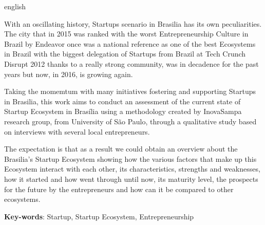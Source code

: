 \begin{resumo}[Abstract]
 \begin{otherlanguage*}{english}

With an oscillating history, Startups scenario in Brasilia has its own peculiarities. The city that in 2015 was ranked with the worst Entrepreneurship Culture in Brazil by Endeavor once was a national reference as one of the best Ecosystems in Brazil with the biggest delegation of Startups from Brazil at Tech Crunch Disrupt 2012 thanks to a really strong community, was in decadence for the past years but now, in 2016, is growing again.

Taking the momemtum with many initiatives fostering and supporting Startups in Brasilia, this work aims to conduct an assessment of the current state of Startup Ecosystem in Brasília using a methodology created by InovaSampa research group, from University of São Paulo, through a qualitative study based on interviews with several local entrepreneurs.

The expectation is that as a result we could obtain an overview about the Brasilia's Startup Ecosystem showing how the various factors that make up this Ecosystem interact with each other, its characteristics, strengths and weaknesses, how it started and how went through until now, its maturity level, the prospects for the future by the entrepreneurs and how can it be compared to other ecosystems.

   \vspace{\onelineskip}

   \noindent
   \textbf{Key-words}: Startup, Startup Ecosystem, Entrepreneurship
 \end{otherlanguage*}
\end{resumo}
